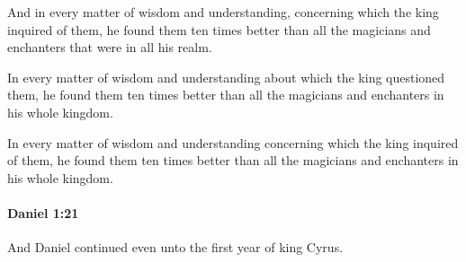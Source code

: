 			\begin{versebox}
					\item[BHS] 
					\item[LXX] 
					\item[ASV] And in every matter of wisdom and understanding, concerning which the king inquired of them, he found them ten times better than all the magicians and enchanters that were in all his realm.
					\item[NIV] In every matter of wisdom and understanding about which the king questioned them, he found them ten times better than all the magicians and enchanters in his whole kingdom.
					\item[NRSV] In every matter of wisdom and understanding concerning which the king inquired of them, he found them ten times better than all the magicians and enchanters in his whole kingdom.
			\end{versebox}

		\paragraph{Daniel 1:21} %
			\label{DANIEL-1-21}

			And Daniel continued even unto the first year of king Cyrus.

